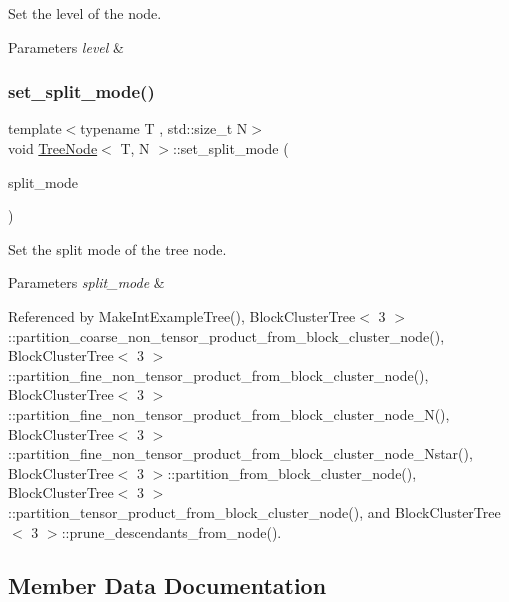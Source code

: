 Set the level of the node. 
\begin{DoxyParams}{Parameters}
{\em level} & \\
\hline
\end{DoxyParams}
\mbox{\label{classTreeNode_a0aec2b9142e931aaaa15d1c451ed9b46}} 
\subsubsection{\texorpdfstring{set\+\_\+split\+\_\+mode()}{set\_split\_mode()}}
{\footnotesize\ttfamily template$<$typename T , std\+::size\+\_\+t N$>$ \\
void \hyperlink{classTreeNode}{Tree\+Node}$<$ T, N $>$\+::set\+\_\+split\+\_\+mode (\begin{DoxyParamCaption}\item[{\hyperlink{tree_8h_a922ca07db9633957939f697a65aff11d}{Tree\+Node\+Split\+Mode}}]{split\+\_\+mode }\end{DoxyParamCaption})}

Set the split mode of the tree node. 
\begin{DoxyParams}{Parameters}
{\em split\+\_\+mode} & \\
\hline
\end{DoxyParams}


Referenced by Make\+Int\+Example\+Tree(), Block\+Cluster\+Tree$<$ 3 $>$\+::partition\+\_\+coarse\+\_\+non\+\_\+tensor\+\_\+product\+\_\+from\+\_\+block\+\_\+cluster\+\_\+node(), Block\+Cluster\+Tree$<$ 3 $>$\+::partition\+\_\+fine\+\_\+non\+\_\+tensor\+\_\+product\+\_\+from\+\_\+block\+\_\+cluster\+\_\+node(), Block\+Cluster\+Tree$<$ 3 $>$\+::partition\+\_\+fine\+\_\+non\+\_\+tensor\+\_\+product\+\_\+from\+\_\+block\+\_\+cluster\+\_\+node\+\_\+\+N(), Block\+Cluster\+Tree$<$ 3 $>$\+::partition\+\_\+fine\+\_\+non\+\_\+tensor\+\_\+product\+\_\+from\+\_\+block\+\_\+cluster\+\_\+node\+\_\+\+Nstar(), Block\+Cluster\+Tree$<$ 3 $>$\+::partition\+\_\+from\+\_\+block\+\_\+cluster\+\_\+node(), Block\+Cluster\+Tree$<$ 3 $>$\+::partition\+\_\+tensor\+\_\+product\+\_\+from\+\_\+block\+\_\+cluster\+\_\+node(), and Block\+Cluster\+Tree$<$ 3 $>$\+::prune\+\_\+descendants\+\_\+from\+\_\+node().



\subsection{Member Data Documentation}
\mbox{\label{classTreeNode_a9fc9333a3e4e05ae878a844370c17888}} 
